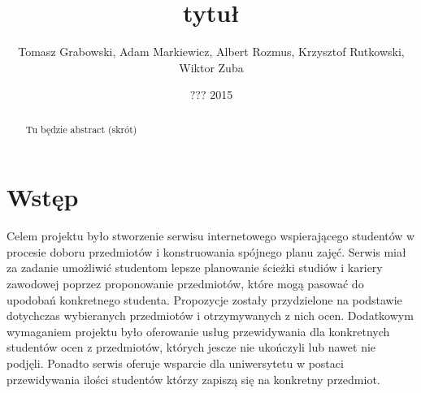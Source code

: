 \documentclass[licencjacka]{pracamgr}
\author{Tomasz Grabowski, Adam Markiewicz, Albert Rozmus, Krzysztof Rutkowski, Wiktor Zuba}
\title{tytuł}
\date{??? 2015}
\begin{document}
\maketitle
\begin{abstract}
Tu będzie abstract (skrót)
\end{abstract}
\tableofcontents
\chapter*{Wstęp}

Celem projektu było stworzenie serwisu internetowego 
wspierającego studentów w procesie doboru przedmiotów
i konstruowania spójnego planu zajęć.
Serwis miał za zadanie 
umożliwić studentom lepsze planowanie ścieżki studiów i kariery zawodowej
poprzez proponowanie przedmiotów, które mogą pasować do upodobań konkretnego studenta.
Propozycje zostały przydzielone na podstawie dotychczas wybieranych przedmiotów i otrzymywanych z nich ocen.
Dodatkowym wymaganiem projektu było oferowanie usług przewidywania dla konkretnych studentów ocen z przedmiotów, których jescze nie ukończyli lub nawet nie podjęli.
Ponadto serwis oferuje wsparcie dla uniwersytetu w postaci
przewidywania ilości studentów którzy zapiszą się na konkretny przedmiot.
 
\end{document}
